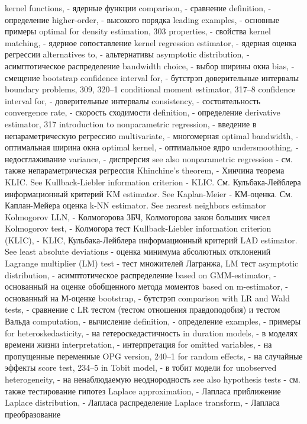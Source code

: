 kernel functions, - ядерные функции 
comparison, - сравнение
definition, - определение
higher-order, - высокого порядка 
leading examples, - основные примеры
optimal for density estimation, 303 
properties, - свойства
kernel matching, - ядерное сопоставление
kernel regression estimator, - ядерная оценка регрессии
alternatives to, - альтернативы
asymptotic distribution, - асимптотическое распределение
bandwidth choice, - выбор ширины окна
bias, - смещение
bootstrap confidence interval for, - бутстрэп доверительные интервалы
boundary problems, 309, 320–1
conditional moment estimator, 317–8
confidence interval for, - доверительные интервалы
consistency, - состоятельность
convergence rate, - скорость сходимости
definition, - определение
derivative estimator, 317
introduction to nonparametric regression, - введение в непараметрическую регрессию
multivariate, - многомерная 
optimal bandwidth, - оптимальная ширина окна
optimal kernel, - оптимальное ядро
undersmoothing, - недосглаживание
variance, - диспрерсия
see also nonparametric regression - см. также непараметрическая регрессия
Khinchine’s theorem, - Хинчина теорема
KLIC. See Kullback-Liebler information criterion - KLIC. См. Кульбака-Лейблера информационный критерий
KM estimator. See Kaplan-Meier - КМ-оценка. См. Каплан-Мейера оценка
k-NN estimator. See nearest neighbors estimator 
Kolmogorov LLN, - Колмогорова ЗБЧ, Колмогорова закон больших чисел
Kolmogorov test, - Колмогора тест
Kullback-Liebler information criterion (KLIC), - KLIC, Кульбака-Лейблера информационный критерий
LAD estimator. See least absolute deviations - оценка минимума абсолютных отклонений
Lagrange multiplier (LM) test - тест множителей Лагранжа, LM тест
asymptotic distribution, - асимптотическое распределение 
based on GMM-estimator, - основанный на оценке обобщенного метода моментов
based on m-estimator, - основанный на М-оценке
bootstrap, - бутстрэп
comparison with LR and Wald tests, - сравнение с LR тестом (тестом отношения правдоподобия) и тестом Вальда 
computation, - вычисление
definition, - определение
examples, - примеры
for heteroskedasticity, - на гетероскедастичность 
in duration models, - в моделях времени жизни 
interpretation, - интерпретация
for omitted variables, - на пропущенные переменные
OPG version, 240–1
for random effects, - на случайные эффекты
score test, 234–5
in Tobit model, - в тобит модели
for unobserved heterogeneity, - на ненаблюдаемую неоднородность 
see also hypothesis tests - см. также тестирование гипотез
Laplace approximation, - Лапласа приближение
Laplace distribution, - Лапласа распределение
Laplace transform, - Лапласа преобразование
